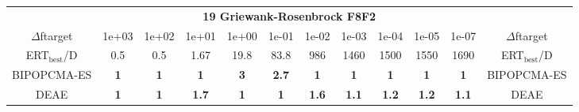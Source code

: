 \begin{tabular}{cccccccccccc}
 & \multicolumn{10}{c}{{\normalsize \textbf{19 Griewank-Rosenbrock F8F2}}}\\
$\Delta$ftarget& 1e+03& 1e+02& 1e+01& 1e+00& 1e-01& 1e-02& 1e-03& 1e-04& 1e-05& 1e-07 & $\Delta$ftarget \\
ERT$_{\textrm{best}}$/D& 0.5& 0.5& 1.67& 19.8& 83.8& 986& 1460& 1500& 1550& 1690 & ERT$_{\textrm{best}}$/D \\
\hline
BIPOPCMA-ES & \textbf{1} & \textbf{1} & \textbf{1} & \textbf{3} & \textbf{2.7} & \textbf{1} & \textbf{1} & \textbf{1} & \textbf{1} & \textbf{1} & BIPOPCMA-ES \cite{add_an_entry_for_BIPOPCMA-ES_in_bbob.bib}\\
DEAE & \textbf{1} & \textbf{1} & \textbf{1.7} & \textbf{1} & \textbf{1} & \textbf{1.6} & \textbf{1.1} & \textbf{1.2} & \textbf{1.2} & \textbf{1.1} & DEAE \cite{add_an_entry_for_DEAE_in_bbob.bib}
\end{tabular}
